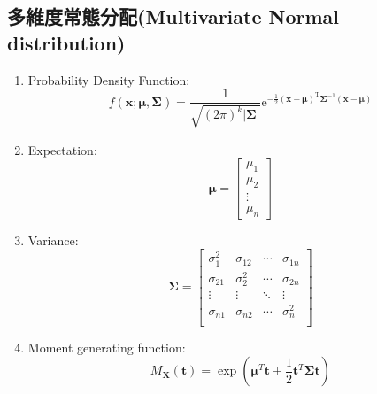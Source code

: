 \subsection{多維度常態分配(Multivariate Normal distribution)}
\begin{enumerate}
\item Probability Density Function:$$f(\mathbf{x}; \boldsymbol{\mu}, \boldsymbol{\Sigma}){={\frac {1}{\sqrt {(2\pi )^{k}|{\boldsymbol {\Sigma }}|}}}\mathrm {e} ^{-{\frac {1}{2}}({\mathbf {x} }-{\boldsymbol {\mu }})^{\mathrm {T} }{\boldsymbol {\Sigma }}^{-1}({\mathbf {x} }-{\boldsymbol {\mu }})}}$$
\item Expectation:$$\boldsymbol{\mu} = \begin{bmatrix} \mu_1 \\ \mu_2 \\ \vdots \\ \mu_n \end{bmatrix}
$$
\item Variance:$$\boldsymbol{\Sigma} = \begin{bmatrix}
\sigma_1^2 & \sigma_{12} & \cdots & \sigma_{1n} \\
\sigma_{21} & \sigma_2^2 & \cdots & \sigma_{2n} \\
\vdots & \vdots & \ddots & \vdots \\
\sigma_{n1} & \sigma_{n2} & \cdots & \sigma_n^2 \\
\end{bmatrix}$$
\item Moment generating function:$$M_{\mathbf{X}}(\mathbf{t}) = \exp\left(\boldsymbol{\mu}^T \mathbf{t} + \frac{1}{2} \mathbf{t}^T \boldsymbol{\Sigma} \mathbf{t}\right)$$
\end{enumerate}
